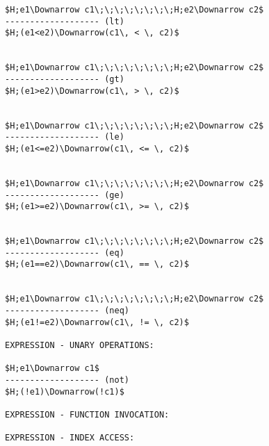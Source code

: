\documentclass[11pt, a4paper]{article}
\begin{document}
\begin{lstlisting}
$H;e1\Downarrow c1\;\;\;\;\;\;\;\;H;e2\Downarrow c2$
------------------- (lt)
$H;(e1<e2)\Downarrow(c1\, < \, c2)$


$H;e1\Downarrow c1\;\;\;\;\;\;\;\;H;e2\Downarrow c2$
------------------- (gt)
$H;(e1>e2)\Downarrow(c1\, > \, c2)$


$H;e1\Downarrow c1\;\;\;\;\;\;\;\;H;e2\Downarrow c2$
------------------- (le)
$H;(e1<=e2)\Downarrow(c1\, <= \, c2)$


$H;e1\Downarrow c1\;\;\;\;\;\;\;\;H;e2\Downarrow c2$
------------------- (ge)
$H;(e1>=e2)\Downarrow(c1\, >= \, c2)$


$H;e1\Downarrow c1\;\;\;\;\;\;\;\;H;e2\Downarrow c2$
------------------- (eq)
$H;(e1==e2)\Downarrow(c1\, == \, c2)$


$H;e1\Downarrow c1\;\;\;\;\;\;\;\;H;e2\Downarrow c2$
------------------- (neq)
$H;(e1!=e2)\Downarrow(c1\, != \, c2)$

EXPRESSION - UNARY OPERATIONS:

$H;e1\Downarrow c1$
------------------- (not)
$H;(!e1)\Downarrow(!c1)$

EXPRESSION - FUNCTION INVOCATION:

EXPRESSION - INDEX ACCESS:
\end{lstlisting}
\end{document}
